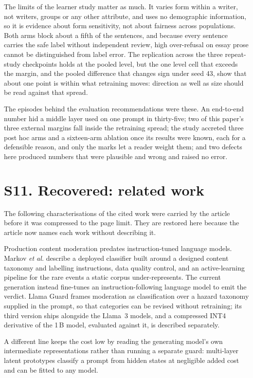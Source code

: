 \documentclass[journal]{IEEEtran}
\begin{document}
The limits of the learner study matter as much. It varies form within a writer,
not writers, groups or any other attribute, and uses no demographic information,
so it is evidence about form sensitivity, not about fairness across
populations. Both arms block about a fifth of the sentences, and because every
sentence carries the safe label without independent review, high over-refusal on
essay prose cannot be distinguished from label error. The replication across the
three repeat-study checkpoints holds at the pooled level, but the one level cell
that exceeds the margin, and the pooled difference that changes sign under seed
43, show that about one point is within what retraining moves: direction as well
as size should be read against that spread.

The episodes behind the evaluation recommendations were these. An end-to-end
number hid a middle layer used on one prompt in thirty-five; two of this paper's
three external margins fall inside the retraining spread; the study accreted
three post hoc arms and a sixteen-arm ablation once its results were known, each
for a defensible reason, and only the marks let a reader weight them; and two
defects here produced numbers that were plausible and wrong and raised no error.

\section*{S11. Recovered: related work}

The following characterisations of the cited work were carried by the article
before it was compressed to the page limit. They are restored here because the
article now names each work without describing it.

Production content moderation predates instruction-tuned language models.
Markov \emph{et al.} describe a deployed classifier built around a designed
content taxonomy and labelling instructions, data quality control, and an
active-learning pipeline for the rare events a static corpus under-represents.
The current generation instead fine-tunes an instruction-following language
model to emit the verdict. Llama Guard frames moderation as classification over
a hazard taxonomy supplied in the prompt, so that categories can be revised
without retraining; its third version ships alongside the Llama~3 models, and a
compressed INT4 derivative of the 1\,B model, evaluated against it, is described
separately.

A different line keeps the cost low by reading the generating model's own
intermediate representations rather than running a separate guard: multi-layer
latent prototypes classify a prompt from hidden states at negligible added cost
and can be fitted to any model.
\end{document}
